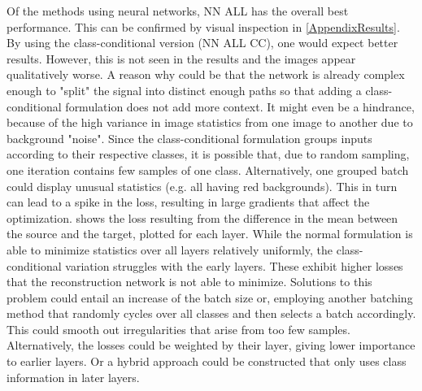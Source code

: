 Of the methods using neural networks, NN ALL has the overall best performance.
This can be confirmed by visual inspection in \cref{AppendixResults}.
By using the class-conditional version (NN ALL CC), one would expect better results.
However, this is not seen in the results and the images appear qualitatively worse. 
A reason why could be that the network is already complex enough to "split" the signal into distinct enough paths so that adding
a class-conditional formulation does not add more context.
It might even be a hindrance, because of the high variance in image statistics
from one image to another due to background "noise".
Since the class-conditional formulation groups inputs according to their respective classes, 
it is possible that, due to random sampling, one iteration contains 
few samples of one class. Alternatively, one grouped batch could
display unusual statistics (e.g. all having red backgrounds).
This in turn can lead to a spike in the loss, resulting in large gradients that affect the optimization.
 shows the loss resulting from the difference in the mean
between the source and the target, plotted for each layer.
While the normal formulation is able to minimize statistics over all layers relatively uniformly,
the class-conditional variation struggles with the early layers.
These exhibit higher losses that the reconstruction network is not able to minimize.
Solutions to this problem could entail an increase of the batch size
or, employing another batching method that randomly cycles over all classes
and then selects a batch accordingly. 
This could smooth out irregularities that arise from too few samples.
Alternatively, the losses could be weighted by their layer, giving lower importance to earlier layers. 
Or a hybrid approach could be constructed that only uses class information in later layers.

